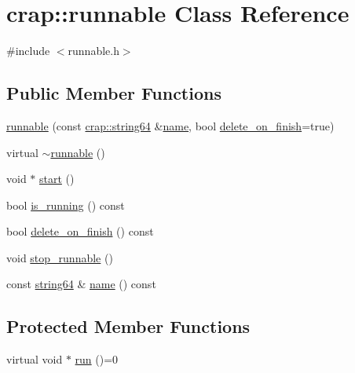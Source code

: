 \hypertarget{classcrap_1_1runnable}{\section{crap\-:\-:runnable Class Reference}
\label{classcrap_1_1runnable}
}


{\ttfamily \#include $<$runnable.\-h$>$}

\subsection*{Public Member Functions}
\begin{DoxyCompactItemize}
\item 
\hyperlink{classcrap_1_1runnable_aa748d88165fe5fa866f69352f702ed79}{runnable} (const \hyperlink{namespacecrap_a502636a1c5819e8500d07deed797ef9f}{crap\-::string64} \&\hyperlink{classcrap_1_1runnable_ab1b24cbdd09024d5a10de5d338d292fe}{name}, bool \hyperlink{classcrap_1_1runnable_a150f0d8ecb5e271e14f72fd7df2e6b0a}{delete\-\_\-on\-\_\-finish}=true)
\item 
virtual \hyperlink{classcrap_1_1runnable_a8c3b48f71f00561fe087d0ab73176490}{$\sim$runnable} ()
\item 
void $\ast$ \hyperlink{classcrap_1_1runnable_ab0d8babed68ae30351db77163b1a69e1}{start} ()
\item 
bool \hyperlink{classcrap_1_1runnable_a115719bfdaa041cb18aca0807c04a6e4}{is\-\_\-running} () const 
\item 
bool \hyperlink{classcrap_1_1runnable_a150f0d8ecb5e271e14f72fd7df2e6b0a}{delete\-\_\-on\-\_\-finish} () const 
\item 
void \hyperlink{classcrap_1_1runnable_a4a7e25ab93880d3478571a954583f016}{stop\-\_\-runnable} ()
\item 
const \hyperlink{namespacecrap_a502636a1c5819e8500d07deed797ef9f}{string64} \& \hyperlink{classcrap_1_1runnable_ab1b24cbdd09024d5a10de5d338d292fe}{name} () const 
\end{DoxyCompactItemize}
\subsection*{Protected Member Functions}
\begin{DoxyCompactItemize}
\item 
virtual void $\ast$ \hyperlink{classcrap_1_1runnable_a1736f4fc00a0d3cae71bcebdaba17658}{run} ()=0
\end{DoxyCompactItemize}
